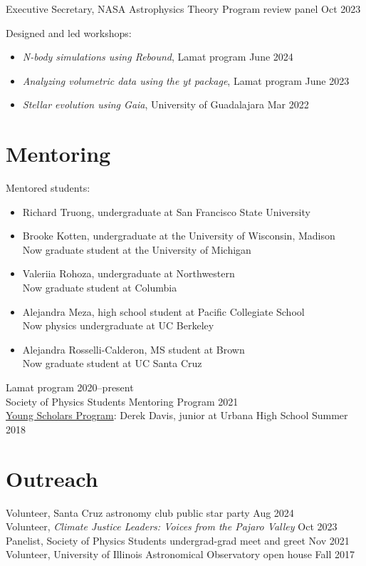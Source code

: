 \documentclass[12pt]{article}
\begin{document}
Executive Secretary, NASA Astrophysics Theory Program review panel \hfill Oct 2023

Designed and led workshops:
\begin{itemize}
\item \textit{N-body simulations using Rebound}, Lamat program \hfill June 2024
\item \textit{Analyzing volumetric data using the yt package}, Lamat program \hfill June 2023
\item \textit{Stellar evolution using Gaia}, University of Guadalajara \hfill Mar 2022
\end{itemize}

\section{Mentoring}
Mentored students:
\begin{itemize}
\item Richard Truong, undergraduate at San Francisco State University
\item Brooke Kotten, undergraduate at the University of Wisconsin, Madison\\Now graduate student at the University of Michigan
\item Valeriia Rohoza, undergraduate at Northwestern\\Now graduate student at Columbia
\item Alejandra Meza, high school student at Pacific Collegiate School\\Now physics undergraduate at UC Berkeley
\item Alejandra Rosselli-Calderon, MS student at Brown\\Now graduate student at UC Santa Cruz
\end{itemize}

Lamat program \hfill 2020--present\\
Society of Physics Students Mentoring Program \hfill 2021\\
\href{https://physics.illinois.edu/outreach/young-scholars}{Young Scholars Program}: Derek Davis, junior at Urbana High School \hfill Summer 2018

\ifdefined\withoutreach{}
\section{Outreach}
Volunteer, Santa Cruz astronomy club public star party \hfill Aug 2024\\
Volunteer, \textit{Climate Justice Leaders: Voices from the Pajaro Valley} \hfill Oct 2023\\
Panelist, Society of Physics Students undergrad-grad meet and greet \hfill Nov 2021\\
Volunteer, University of Illinois Astronomical Observatory open house \hfill Fall 2017
\else\fi
\end{document}
